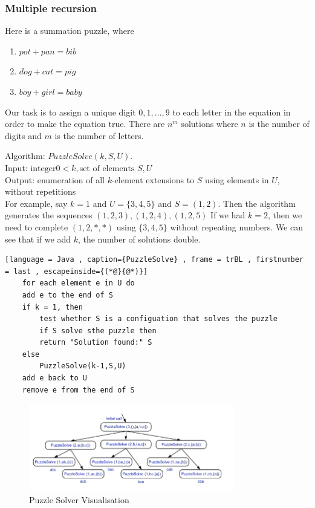 \documentclass[a4paper]{article}
\theoremstyle{plain}
\theoremstyle{definition}
\newtheorem{exmp}{Example}[section]
\theoremstyle{remark}
\begin{document}
\subsubsection{Multiple recursion}
Here is a summation puzzle, where
\begin{enumerate}
	\item $pot+pan = bib$ 
	\item $dog+cat=pig$ 
	\item $boy+girl=baby$
\end{enumerate}
Our task is to assign a unique digit $0,1,\ldots,9$ to each letter in the equation in order to make the equation true. There are $n^{m}$ solutions where $n$ is the number of digits and $m$ is the number of letters.
\begin{tcolorbox}[colback=black!3!white,colframe=black!60!white,title=\begin{exmp}Multiple recursion solution \label{Multiple recursion solution}\end{exmp}]
        Algorithm: $PuzzleSolve(k,S,U)$. \\
	Input: $\text{integer} 0<k, \text{set of elements }S,U $ \\
	Output: enumeration of all $k$-element extensions to $S$ using elements in $U$, without repetitions \\
	For example, say $k=1$ and $U = \{3,4,5\}$ and $S = (1,2)$. Then the algorithm generates the sequences $(1,2,3),(1,2,4),(1,2,5)$ If we had $k=2$, then we need to complete $(1,2,*,*)$ using $\{3,4,5\}$ without repeating numbers. We can see that if we add $k$, the number of solutions double. 
	\begin{lstlisting}[language = Java , caption={PuzzleSolve} , frame = trBL , firstnumber = last , escapeinside={(*@}{@*)}]
	for each element e in U do
	add e to the end of S
	if k = 1, then
		test whether S is a configuation that solves the puzzle
		if S solve sthe puzzle then
		return "Solution found:" S
	else
		PuzzleSolve(k-1,S,U)
	add e back to U
	remove e from the end of S
	\end{lstlisting}
	\begin{figure}[H]
		\centering
		\includegraphics[width=0.8\textwidth]{figures/solver.png}
		\caption{Puzzle Solver Visualisation}
		\label{fig:figures-solver-png}
	\end{figure}
\end{tcolorbox}
\end{document}
